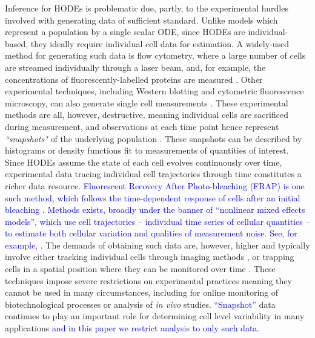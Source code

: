 Inference for HODEs is problematic due, partly, to the experimental hurdles involved with generating data of sufficient standard. Unlike models which represent a population by a single scalar ODE, since HODEs are individual-based, they ideally require individual cell data for estimation. A widely-used method for generating such data is flow cytometry, where a large number of cells are streamed individually through a laser beam, and, for example, the concentrations of fluorescently-labelled proteins are measured \cite{telford2012flow}. Other experimental techniques, including Western blotting and cytometric fluorescence microscopy, can also generate single cell measurements \cite{hughes2014single,hasenauer2011identification}. These experimental methods are all, however, destructive, meaning individual cells are sacrificed during measurement, and observations at each time point hence represent \emph{``snapshots"} of the underlying population \cite{hasenauer2011identification}. These snapshots can be described by histograms \cite{dixit2018maximum} or density functions \cite{waldherr2018estimation} fit to measurements of quantities of interest. Since HODEs assume the state of each cell evolves continuously over time, experimental data tracing individual cell trajectories through time constitutes a richer data resource. \textcolor{blue}{Fluorescent Recovery After Photo-bleaching (FRAP) is one such method, which follows the time-dependent response of cells after an initial bleaching \cite{karlsson2015nonlinear}. Methods exists, broadly under the banner of ``nonlinear mixed effects models'', which use cell trajectories -- individual time series of cellular quantities -- to estimate both cellular variation and qualities of measurement noise. See, for example, \cite{karlsson2015nonlinear,zechner2014scalable,dharmarajan2019simple}.} The demands of obtaining such data are, however, higher and typically involve either tracking individual cells through imaging methods \cite{hilsenbeck2016software}, or trapping cells in a spatial position where they can be monitored over time \cite{fritzsch2012single}. These techniques impose severe restrictions on experimental practices meaning they cannot be used in many circumstances, including for online monitoring of biotechnological processes or analysis of \textit{in vivo} studies. \textcolor{blue}{``Snapshot''} data continues to play an important role for determining cell level variability in many applications \textcolor{blue}{and in this paper we restrict analysis to only such data.}

